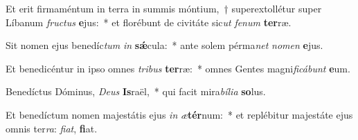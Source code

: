 \item Et erit firmaméntum in terra in summis móntium,~† superextollétur super Líbanum \textit{fruc}\textit{tus} \textbf{e}jus:~* et florébunt de civitáte sic\textit{ut} \textit{fe}\textit{num} \textbf{ter}ræ.
\item Sit nomen ejus benedíc\textit{tum} \textit{in} \textbf{sǽ}cula:~* ante solem pérma\textit{net} \textit{no}\textit{men} \textbf{e}jus.
\item Et benedicéntur in ipso omnes \textit{tri}\textit{bus} \textbf{ter}ræ:~* omnes Gentes magni\textit{fi}\textit{cá}\textit{bunt} \textbf{e}um.
\item Benedíctus Dóminus, \textit{De}\textit{us} \textbf{Is}raël,~* qui facit mira\textit{bí}\textit{li}\textit{a} \textbf{so}lus.
\item Et benedíctum nomen majestátis ejus \textit{in} \textit{æ}\textbf{tér}num:~* et replébitur majestáte ejus omnis ter\textit{ra}: \textit{fi}\textit{at}, \textbf{fi}at.
